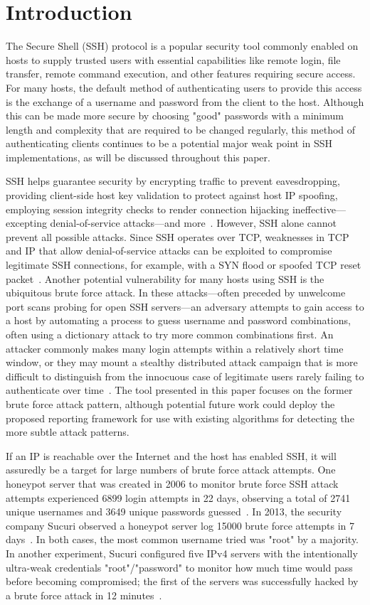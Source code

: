 \section{Introduction}
The Secure Shell (SSH) protocol is a popular security tool commonly enabled on hosts to supply trusted users with essential capabilities like remote login, file transfer, remote command execution, and other features requiring secure access. For many hosts, the default method of authenticating users to provide this access is the exchange of a username and password from the client to the host. Although this can be made more secure by choosing "good" passwords with a minimum length and complexity that are required to be changed regularly, this method of authenticating clients continues to be a potential  major weak point in SSH implementations, as will be discussed throughout this paper.

SSH helps guarantee security by encrypting traffic to prevent eavesdropping, providing client-side host key validation to protect against host IP spoofing, employing session integrity checks to render connection hijacking ineffective---excepting denial-of-service attacks---and more~\cite{sshbook}. However, SSH alone cannot prevent all possible attacks. Since SSH operates over TCP, weaknesses in TCP and IP that allow denial-of-service attacks can be exploited to compromise legitimate SSH connections, for example, with a SYN flood or spoofed TCP reset packet~\cite{sshbook}. Another potential vulnerability for many hosts using SSH is the ubiquitous brute force attack. In these attacks---often preceded by unwelcome port scans probing for open SSH servers---an adversary attempts to gain access to a host by automating a process to guess username and password combinations, often using a dictionary attack to try more common combinations first. An attacker commonly makes many login attempts within a relatively short time window, or they may mount a stealthy distributed attack campaign that is more difficult to distinguish from the innocuous case of legitimate users rarely failing to authenticate over time~\cite{stealthy}. The tool presented in this paper focuses on the former brute force attack pattern, although potential future work could deploy the proposed reporting framework for use with existing algorithms for detecting the more subtle attack patterns.

If an IP is reachable over the Internet and the host has enabled SSH, it will assuredly be a target for large numbers of brute force attack attempts. One honeypot server that was created in 2006 to monitor brute force SSH attack attempts experienced 6899 login attempts in 22 days, observing a total of 2741 unique usernames and 3649 unique passwords guessed~\cite{symantec}. In 2013, the security company Sucuri observed a honeypot server log 15000 brute force attempts in 7 days~\cite{sucuri1}. In both cases, the most common username tried was "root" by a majority. In another experiment, Sucuri configured five IPv4 servers with the intentionally ultra-weak credentials "root"/"password" to monitor how much time would pass before becoming compromised; the first of the servers was successfully hacked by a brute force attack in 12 minutes~\cite{sucuri2}. 

